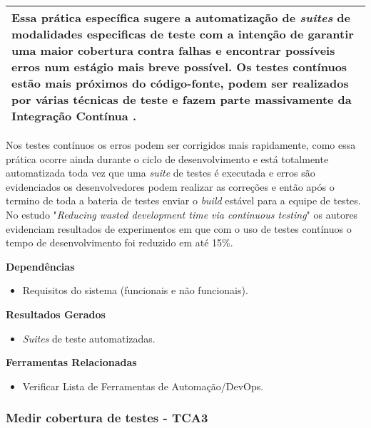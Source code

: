 \begin{table}[H]
\centering
\begin{tabular}{|p{130mm}|}
\hline
Essa prática específica sugere a automatização de \textit{suites} de modalidades especificas de teste com a intenção de garantir uma maior cobertura contra falhas e encontrar possíveis erros num estágio mais breve possível. Os testes contínuos estão mais próximos do código-fonte, podem ser realizados por várias técnicas de teste e fazem parte massivamente da Integração Contínua \cite{BRAGA2015}.\\ 
\hline
\end{tabular}
\end{table}

Nos testes contínuos os erros podem ser corrigidos mais rapidamente, como essa prática ocorre ainda durante o ciclo de desenvolvimento e está totalmente automatizada toda vez que uma \textit{suite} de testes é executada e erros são evidenciados os desenvolvedores podem realizar as correções e então após o termino de toda a bateria de testes enviar o \textit{build} estável para a equipe de testes. No estudo "\textit{Reducing wasted development time via continuous testing}" \cite{salf2003} os autores evidenciam resultados de experimentos em que com o uso de testes contínuos o tempo de desenvolvimento foi reduzido em até 15\%.


\textbf{Dependências}
\begin{itemize}
    \item Requisitos do sistema (funcionais e não funcionais).
\end{itemize}

\textbf{Resultados Gerados}
\begin{itemize}
    \item \textit{Suites} de teste automatizadas.

\end{itemize}

\textbf{Ferramentas Relacionadas}
\begin{itemize}
    \item Verificar Lista de Ferramentas de Automação/DevOps.
\end{itemize}


\subsubsection{Medir cobertura de testes - TCA3}
\label{sec:tca3}

